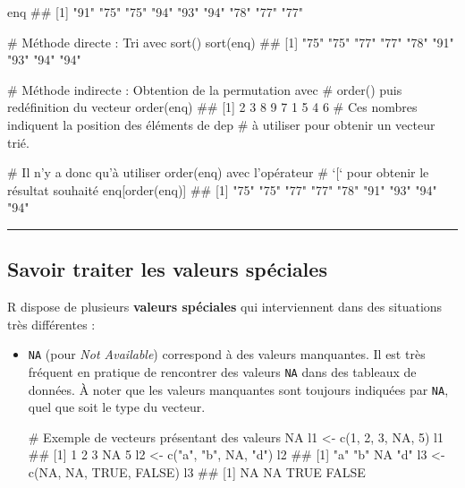 \documentclass[12pt,twosided, notitlepage]{book}
\newenvironment{Shaded}{}{}
\newcommand{\KeywordTok}[1]{\textcolor[rgb]{0.00,0.00,1.00}{{#1}}}
\newcommand{\DecValTok}[1]{{#1}}
\newcommand{\StringTok}[1]{\textcolor[rgb]{0.00,0.50,0.50}{{#1}}}
\newcommand{\CommentTok}[1]{\textcolor[rgb]{0.00,0.50,0.00}{{#1}}}
\newcommand{\OtherTok}[1]{\textcolor[rgb]{1.00,0.25,0.00}{{#1}}}
\newcommand{\NormalTok}[1]{{#1}}
\renewenvironment{Shaded}{\begin{snugshade}}{\end{snugshade}}
\begin{document}
\begin{Shaded}
\begin{Highlighting}[]
\NormalTok{enq}
  \NormalTok{## [1] "91" "75" "75" "94" "93" "94" "78" "77" "77"}

\CommentTok{# Méthode directe : Tri avec sort()}
\KeywordTok{sort}\NormalTok{(enq)}
  \NormalTok{## [1] "75" "75" "77" "77" "78" "91" "93" "94" "94"}

\CommentTok{# Méthode indirecte : Obtention de la permutation avec }
\CommentTok{# order() puis redéfinition du vecteur}
\KeywordTok{order}\NormalTok{(enq)}
  \NormalTok{## [1] 2 3 8 9 7 1 5 4 6}
\CommentTok{# Ces nombres indiquent la position des éléments de dep}
\CommentTok{# à utiliser pour obtenir un vecteur trié. }

\CommentTok{# Il n'y a donc qu'à utiliser order(enq) avec l'opérateur}
\CommentTok{# `[` pour obtenir le résultat souhaité}
\NormalTok{enq[}\KeywordTok{order}\NormalTok{(enq)]}
  \NormalTok{## [1] "75" "75" "77" "77" "78" "91" "93" "94" "94"}
\end{Highlighting}
\end{Shaded}

\begin{center} \rule{0.5\linewidth}{\linethickness}\end{center}

\bigskip  \fi 

\subsection{Savoir traiter les valeurs
spéciales}\label{savoir-traiter-les-valeurs-speciales}

R dispose de plusieurs \textbf{valeurs spéciales} qui interviennent dans
des situations très différentes :

\begin{itemize}
\item
  \texttt{NA} (pour \emph{Not Available}) correspond à des valeurs
  manquantes. Il est très fréquent en pratique de rencontrer des valeurs
  \texttt{NA} dans des tableaux de données. À noter que les valeurs
  manquantes sont toujours indiquées par \texttt{NA}, quel que soit le
  type du vecteur.

\begin{Shaded}
\begin{Highlighting}[]
\CommentTok{# Exemple de vecteurs présentant des valeurs NA}
\NormalTok{l1 <-}\StringTok{ }\KeywordTok{c}\NormalTok{(}\DecValTok{1}\NormalTok{, }\DecValTok{2}\NormalTok{, }\DecValTok{3}\NormalTok{, }\OtherTok{NA}\NormalTok{, }\DecValTok{5}\NormalTok{)}
\NormalTok{l1}
  \NormalTok{## [1]  1  2  3 NA  5}
\NormalTok{l2 <-}\StringTok{ }\KeywordTok{c}\NormalTok{(}\StringTok{"a"}\NormalTok{, }\StringTok{"b"}\NormalTok{, }\OtherTok{NA}\NormalTok{, }\StringTok{"d"}\NormalTok{)}
\NormalTok{l2}
  \NormalTok{## [1] "a" "b" NA  "d"}
\NormalTok{l3 <-}\StringTok{ }\KeywordTok{c}\NormalTok{(}\OtherTok{NA}\NormalTok{, }\OtherTok{NA}\NormalTok{, }\OtherTok{TRUE}\NormalTok{, }\OtherTok{FALSE}\NormalTok{)}
\NormalTok{l3}
  \NormalTok{## [1]    NA    NA  TRUE FALSE}
\end{Highlighting}
\end{Shaded}
\end{itemize}
\end{document}
